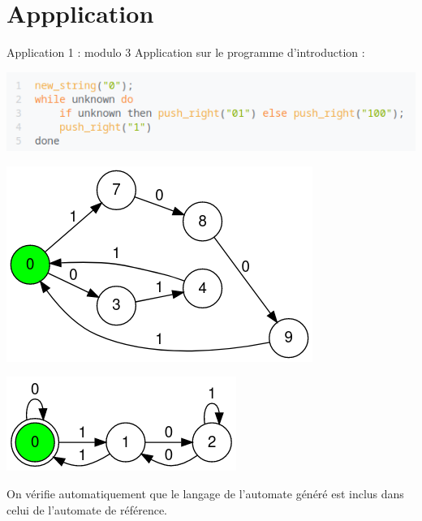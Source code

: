 \documentclass{beamer}
\begin{document}
\section{Appplication}

\begin{frame}{Application 1 : modulo 3}
  Application sur le programme d'introduction :

  \includegraphics[scale=0.6]{ prog1 }

  \begin{minipage}{0.49\linewidth}
    \includegraphics[width=\linewidth]{ application1 }
  \end{minipage}%
  \hfill
  \begin{minipage}{0.40\linewidth}
    \includegraphics[width=\linewidth]{ mod_3_ref }
  \end{minipage}
  On vérifie automatiquement que le langage de l'automate généré est inclus dans celui
  de l'automate de référence.
\end{frame}
\end{document}

